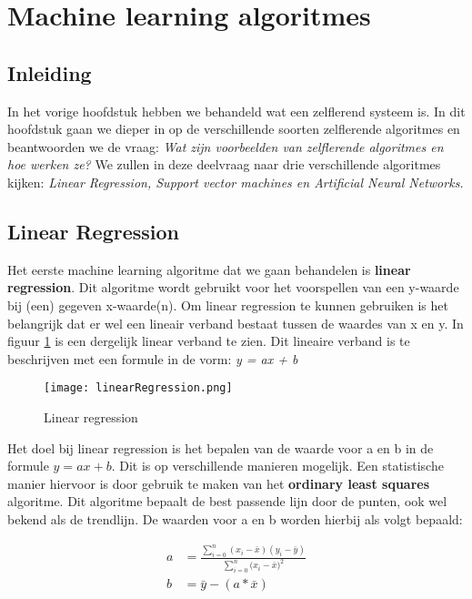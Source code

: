 \section{Machine learning algoritmes}
\label{chapter:MLA}

\subsection{Inleiding}
In het vorige hoofdstuk hebben we behandeld wat een zelflerend systeem is. In dit hoofdstuk gaan we dieper in op de verschillende soorten zelflerende algoritmes en beantwoorden we de vraag: \textit{Wat zijn voorbeelden van zelflerende algoritmes en hoe werken ze?} We zullen in deze deelvraag naar drie verschillende algoritmes kijken: \textit{Linear Regression, Support vector machines en Artificial Neural Networks.} \cite{SunilRay} 

\subsection{Linear Regression}
Het eerste machine learning algoritme dat we gaan behandelen is \textbf{linear regression}. Dit algoritme wordt gebruikt voor het voorspellen van een y-waarde bij (een) gegeven x-waarde(n). Om linear regression te kunnen gebruiken is het belangrijk dat er wel een lineair verband bestaat tussen de waardes van x en y. In figuur \ref{fig:LinearRegression1} is een dergelijk linear verband te zien. 
Dit lineaire verband is te beschrijven met een formule in de vorm: \textit{y = ax + b}

\begin{figure}[h]
  \centering
    \texttt{[image: linearRegression.png]}
  \caption{Linear regression}
  \label{fig:LinearRegression1}
\end{figure}

Het doel bij linear regression is het bepalen van de waarde voor a en b in de formule $ y = ax + b $. Dit is op verschillende manieren mogelijk. Een statistische manier hiervoor is door gebruik te maken van het \textbf{ordinary least squares} algoritme. Dit algoritme bepaalt de best passende lijn door de punten, ook wel bekend als de trendlijn. De waarden voor a en b worden hierbij als volgt bepaald:

\begin{align*}
	a&=\frac{\sum_{i=0}^{n}(x_{i}-\bar{x})(y_{i}-\bar{y})}{\sum_{i=0}^{n}{(x_{i}-\bar{x}})^{2}}\\
	b&=\bar{y}-(a * \bar{x})
\end{align*}

